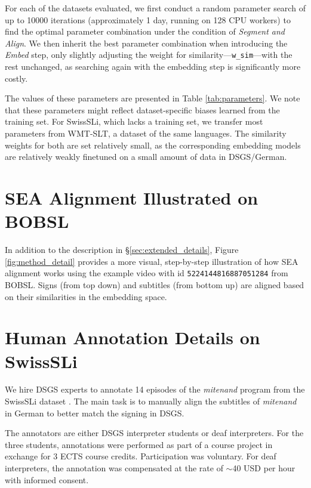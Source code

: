 \documentclass[11pt]{article}
\begin{document}
For each of the datasets evaluated, we first conduct a random parameter search of up to \num{10000} iterations (approximately 1 day, running on 128 CPU workers) to find the optimal parameter combination under the condition of \textit{Segment and Align}.
We then inherit the best parameter combination when introducing the \textit{Embed} step, only slightly adjusting the weight for similarity—\texttt{w\_sim}—with the rest unchanged, as searching again with the embedding step is significantly more costly.

The values of these parameters are presented in Table \ref{tab:parameters}.
We note that these parameters might reflect dataset-specific biases learned from the training set.
For SwissSLi, which lacks a training set, we transfer most parameters from WMT-SLT, a dataset of the same languages.
The similarity weights for both are set relatively small, as the corresponding embedding models are relatively weakly finetuned on a small amount of data in DSGS/German.


\section{SEA Alignment Illustrated on BOBSL}

In addition to the description in \S\ref{sec:extended_details}, Figure \ref{fig:method_detail} provides a more visual, step-by-step illustration of how SEA alignment works using the example video with id \texttt{5224144816887051284} from BOBSL.
Signs (from top down) and subtitles (from bottom up) are aligned based on their similarities in the embedding space.

\section{Human Annotation Details on SwissSLi}
\label{sec:human_annotation}

We hire DSGS experts to annotate 14 episodes of the \textit{mitenand} program from the SwissSLi dataset \cite{jiang-etal-2024-swisssli}.
The main task is to manually align the subtitles of \textit{mitenand} in German to better match the signing in DSGS.

The annotators are either DSGS interpreter students or deaf interpreters.
For the three students, annotations were performed as part of a course project in exchange for 3 ECTS course credits. Participation was voluntary.
For deaf interpreters, the annotation was compensated at the rate of $\sim$40 USD per hour with informed consent.
\end{document}
